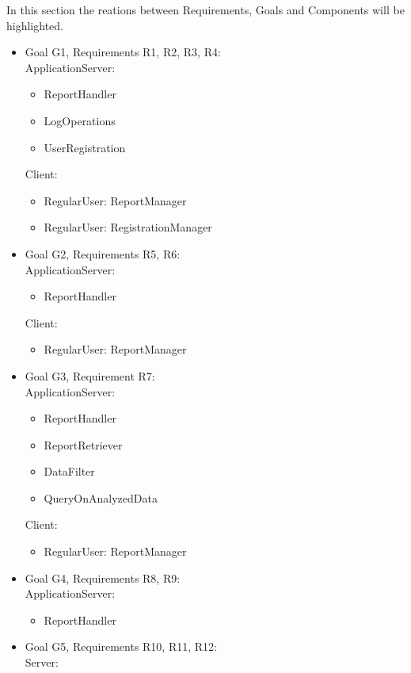 In this section the reations between Requirements, Goals and Components will be highlighted.\\

\begin{itemize}
	\item Goal G1, Requirements R1, R2, R3, R4: \\ 
	ApplicationServer:
	\begin{itemize}
		\item ReportHandler
		\item LogOperations
		\item UserRegistration
	\end{itemize}
	Client:
	\begin{itemize}
		\item RegularUser: ReportManager
		\item RegularUser: RegistrationManager
	\end{itemize}
	\item Goal G2, Requirements R5, R6:\\
	ApplicationServer:
	\begin{itemize}
		\item ReportHandler
	\end{itemize}
	Client:	
	\begin{itemize}
		\item RegularUser: ReportManager
	\end{itemize}
	\item Goal G3, Requirement R7:\\
	ApplicationServer:
	\begin{itemize}
		\item ReportHandler
		\item ReportRetriever
		\item DataFilter
		\item QueryOnAnalyzedData
	\end{itemize}
	Client:
	\begin{itemize}
		\item RegularUser: ReportManager
	\end{itemize}
	\item Goal G4, Requirements R8, R9:\\
	ApplicationServer:
	\begin{itemize}
		\item ReportHandler
	\end{itemize}
	\item Goal G5, Requirements R10, R11, R12:\\Server:

\end{itemize}
